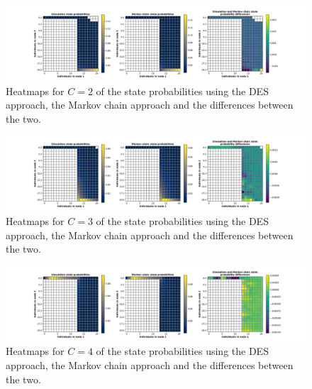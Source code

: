 \begin{figure}[H]
    \includegraphics[width=\textwidth, trim=100 10 100 10, clip]{chapters/03_queueing_model/Bin/numeric_results_and_timings/steady_state_probabilities_2/main_2.pdf}
    \caption{Heatmaps for \(C = 2\) of the state probabilities using the
    DES approach, the Markov chain approach and the differences between the
    two.}
    \label{fig:comparison_steady_state_probabilities_2_2}
\end{figure}

\begin{figure}[H]
    \includegraphics[width=\textwidth, trim=100 10 100 10, clip]{chapters/03_queueing_model/Bin/numeric_results_and_timings/steady_state_probabilities_2/main_3.pdf}
    \caption{Heatmaps for \(C = 3\) of the state probabilities using the
    DES approach, the Markov chain approach and the differences between the
    two.}
    \label{fig:comparison_steady_state_probabilities_2_3}
\end{figure}

\begin{figure}[H]
    \includegraphics[width=\textwidth, trim=100 10 100 10, clip]{chapters/03_queueing_model/Bin/numeric_results_and_timings/steady_state_probabilities_2/main_4.pdf}
    \caption{Heatmaps for \(C = 4\) of the state probabilities using the
    DES approach, the Markov chain approach and the differences between the
    two.}
    \label{fig:comparison_steady_state_probabilities_2_4}
\end{figure}

